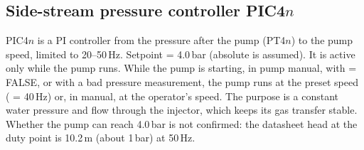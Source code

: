 \documentclass[11pt,a4paper]{article}
\begin{document}
\subsection{Side-stream pressure controller PIC4\texorpdfstring{$n$}{n}}
PIC4$n$ is a PI controller from the pressure after the pump (PT4$n$) to the pump speed, limited
to 20--50\,Hz. Setpoint  = 4.0\,bar (absolute is assumed). It is
active only while the pump runs. While the pump is starting, in pump manual, with
 = FALSE, or with a bad pressure measurement, the pump runs at
the preset speed ( = 40\,Hz) or, in manual, at the operator's speed. The
purpose is a constant water pressure and flow through the injector, which keeps its gas transfer
stable. Whether the pump can reach 4.0\,bar is not confirmed: the datasheet head at the duty
point is 10.2\,m (about 1\,bar) at 50\,Hz.
\end{document}
